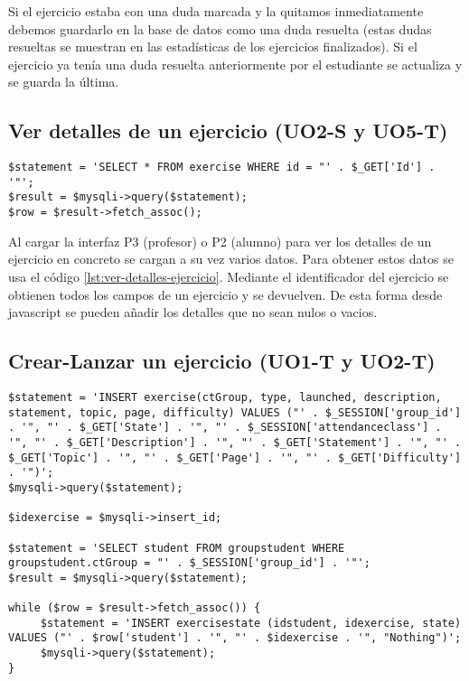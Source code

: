 Si el ejercicio estaba con una duda marcada y la quitamos inmediatamente debemos guardarlo en la base de datos como una duda resuelta (estas dudas resueltas se muestran en las estadísticas de los ejercicios finalizados). Si el ejercicio ya tenía una duda resuelta anteriormente por el estudiante se actualiza y se guarda la última.\\

 
\subsection{Ver detalles de un ejercicio (UO2-S y UO5-T)}
\label{diseno-e-implementacion:logica-negocio:ver-detalles-ejercicio}

\noindent
\begin{lstlisting}[caption=Ver detalles de un ejercicio.,label={lst:ver-detalles-ejercicio}]
$statement = 'SELECT * FROM exercise WHERE id = "' . $_GET['Id'] . '"';
$result = $mysqli->query($statement);
$row = $result->fetch_assoc();
\end{lstlisting}

Al cargar la interfaz P3 (profesor) o P2 (alumno) para ver los detalles de un ejercicio en concreto se cargan a su vez varios datos. Para obtener estos datos se usa el código \ref{lst:ver-detalles-ejercicio}. Mediante el identificador del ejercicio se obtienen todos los campos de un ejercicio y se devuelven. De esta forma desde javascript se pueden añadir los detalles que no sean nulos o vacios.\\

\subsection{Crear-Lanzar un ejercicio (UO1-T y UO2-T)}
\label{diseno-e-implementacion:logica-negocio:crear-lanzar-ejercicio}

\noindent
\begin{lstlisting}[caption=Crear-lanzar un ejercicio.,label={lst:crear-lanzar-ejercicio}]
$statement = 'INSERT exercise(ctGroup, type, launched, description, statement, topic, page, difficulty) VALUES ("' . $_SESSION['group_id'] . '", "' . $_GET['State'] . '", "' . $_SESSION['attendanceclass'] . '", "' . $_GET['Description'] . '", "' . $_GET['Statement'] . '", "' . $_GET['Topic'] . '", "' . $_GET['Page'] . '", "' . $_GET['Difficulty'] . '")';
$mysqli->query($statement);

$idexercise = $mysqli->insert_id;

$statement = 'SELECT student FROM groupstudent WHERE groupstudent.ctGroup = "' . $_SESSION['group_id'] . '"';
$result = $mysqli->query($statement);

while ($row = $result->fetch_assoc()) {
     $statement = 'INSERT exercisestate (idstudent, idexercise, state) VALUES ("' . $row['student'] . '", "' . $idexercise . '", "Nothing")';
     $mysqli->query($statement);
}
\end{lstlisting}

